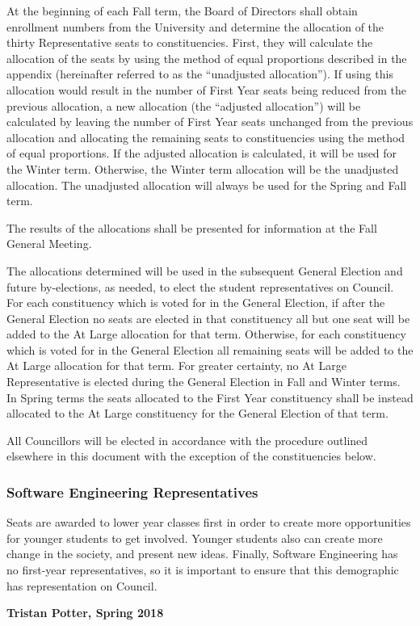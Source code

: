 At the beginning of each Fall term, the Board of Directors shall obtain enrollment numbers from the University and determine the allocation of the thirty Representative seats to constituencies. First, they will calculate the allocation of the seats by using the method of equal proportions described in the appendix (hereinafter referred to as the ``unadjusted allocation''). If using this allocation would result in the number of First Year seats being reduced from the previous allocation, a new allocation (the ``adjusted allocation'') will be calculated by leaving the number of First Year seats unchanged from the previous allocation and allocating the remaining seats to constituencies using the method of equal proportions. If the adjusted allocation is calculated, it will be used for the Winter term. Otherwise, the Winter term allocation will be the unadjusted allocation. The unadjusted allocation will always be used for the Spring and Fall term.

The results of the allocations shall be presented for information at the 
Fall General Meeting.

The allocations determined will be used in the subsequent General Election and
future by-elections, as needed, to elect the student representatives on
Council. For each constituency which is voted for in the General Election, if 
after the General Election no seats are elected in that constituency all but 
one seat will be added to the At Large allocation for that term. Otherwise,
for each constituency which is voted for in the General Election all remaining
seats will be added to the At Large allocation for that term. For greater certainty,
no At Large Representative is elected during the General Election in Fall and Winter terms. 
In Spring terms the seats allocated to the First Year constituency shall be instead allocated
to the At Large constituency for the General Election of that term. 


All Councillors will be elected in accordance with the procedure outlined
elsewhere in this document with the exception of the constituencies below.

\subsubsection{Software Engineering Representatives}
\begin{annotation}
    Seats are awarded to lower year classes first in order to create more
    opportunities for younger students to get involved. Younger students also
    can create more change in the society, and present new ideas. Finally,
    Software Engineering has no first-year representatives, so it is important
    to ensure that this demographic has representation on Council.
    
    \textbf{Tristan Potter, Spring 2018}
\end{annotation}

